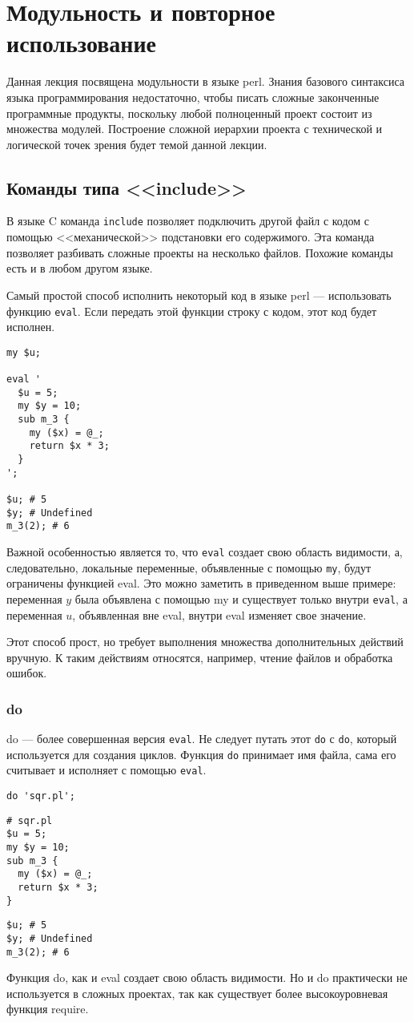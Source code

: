 \setcounter{chapter}{2}
\chapter{Модульность и повторное использование}
Данная лекция посвящена модульности в языке perl. Знания базового синтаксиса языка программирования недостаточно, чтобы писать сложные законченные программные продукты, поскольку любой полноценный проект состоит из множества модулей. Построение сложной иерархии проекта с технической и логической точек зрения будет темой данной лекции.

\section{Команды типа <<include>>} %
В языке C команда \verb|include| позволяет подключить другой файл с кодом с помощью <<механической>> подстановки его содержимого. Эта команда позволяет разбивать сложные проекты на несколько файлов. Похожие команды есть и в любом другом языке.

Самый простой способ исполнить некоторый код в языке perl --- использовать функцию \verb|eval|. Если передать этой функции строку с кодом, этот код будет исполнен.
\begin{verbatim}
my $u;

eval '
  $u = 5;
  my $y = 10;
  sub m_3 {
    my ($x) = @_;
    return $x * 3;
  }
';

$u; # 5
$y; # Undefined
m_3(2); # 6
\end{verbatim}
Важной особенностью является то, что \verb|eval| создает свою область видимости, а, следовательно, локальные переменные, объявленные с помощью \verb|my|, будут ограничены функцией eval. Это можно заметить в приведенном выше примере: переменная $y$ была объявлена с помощью my и существует только внутри \verb|eval|, а переменная $u$, объявленная вне eval, внутри eval изменяет свое значение.

Этот способ прост, но требует выполнения множества дополнительных действий вручную. К таким действиям относятся, например, чтение файлов и обработка ошибок.

\subsection{do} %
do --- более совершенная версия \verb|eval|. Не следует путать этот \verb|do| с \verb|do|, который используется для создания циклов. Функция \verb|do| принимает имя файла, сама его считывает и исполняет с помощью \verb|eval|.
\begin{verbatim}
do 'sqr.pl';
\end{verbatim}
\begin{verbatim}
# sqr.pl
$u = 5;
my $y = 10;
sub m_3 {
  my ($x) = @_;
  return $x * 3;
}
\end{verbatim}
\begin{verbatim}
$u; # 5
$y; # Undefined
m_3(2); # 6
\end{verbatim}
Функция do, как и eval создает свою область видимости. Но и do практически не используется в сложных проектах, так как существует более высокоуровневая функция require.

